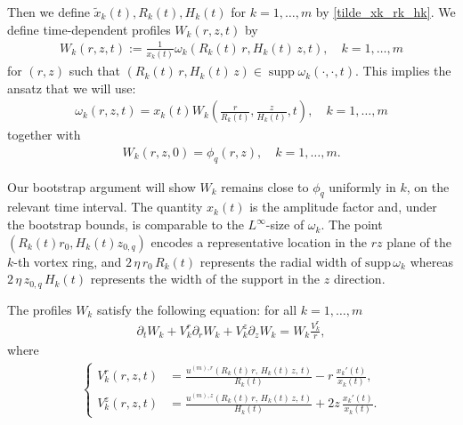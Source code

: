 \documentclass[reqno,11pt]{amsart}
\newcommand{\supp}{\operatorname{supp}}
\begin{document}
Then we define $\tilde x_k(t), R_k(t), H_k(t)$ for $k=1,\ldots, m$ by \eqref{tilde_xk_rk_hk}. 
We define time-dependent profiles $W_k(r,z,t)$ by
    \begin{align}
    \label{eq:def_wk94}
       W_k(r,z,t):=
       \frac{1}{x_k(t)} \omega_k (R_k(t) \, r, H_k(t) \, z, t), \quad k=1,\ldots,m
    \end{align}
for $(r,z)$ such that $(R_k(t)\, r, H_k(t) \, z)\in \supp \omega_k(\cdot,\cdot,t).$
This implies the ansatz that we will use:
    \begin{align*}
    \omega_k(r,z,t)= x_k(t) W_k\left(
        \frac{r}{R_k(t)}, \frac{z}{H_k(t)}, t
    \right), \quad k=1,\ldots,m
    \end{align*}
together with 
    \begin{align*}
        W_k(r,z,0)= \phi_q(r,z), \quad k=1,\ldots,m.
    \end{align*}




Our bootstrap argument will show $W_k$ remains close to $\phi_q$ uniformly in $k$, on the relevant time interval. 
The quantity $x_k(t)$ is the amplitude factor and, under the bootstrap bounds, is comparable to the $L^\infty$-size of $\omega_k$.
The point $(R_k(t)r_0, H_k (t)z_{0,q})$ encodes a representative location in the $rz$ plane of the $k$-th vortex ring, and $2\, \eta\,  r_0 \,R_k(t)$  represents the radial width of $\mathrm{supp} \, \omega_k$ whereas $2\, \eta\, z_{0,q}\, H_k(t)$ represents the width of the support in the $z$ direction.


The profiles $W_k$ satisfy the following equation: for all $k=1,\ldots, m$
    \begin{align}
    \label{eq_W_k2}
        \partial_t W_k 
        + V^r_k  \partial_r W_k
        + V^z_k \partial_z W_k = W_k \frac{V^r_k}{r},
    \end{align}
where
    \begin{align}
    \label{def_v_k14}
    \left\{
    \begin{aligned}
        V^r_k (r,z,t)
    &=
        \frac{u^{(m),r} 
        \left( R_k(t) \, r, \, H_k(t)\,  z, \,
        t \right)
        }{ R_k(t) }
        -r \, \frac{x_k'(t)}{x_k(t)},
        \\
        V^z_k (r,z,t)
    &=
        \frac{u^{(m),z} 
        \left( R_k(t) \, r,\, H_k(t) \, z, \, t \right)
        }{
        H_k(t)
        }
        +2z \, \frac{x_k'(t)}{x_k(t)}.
    \end{aligned}
    \right.
    \end{align}
\end{document}
